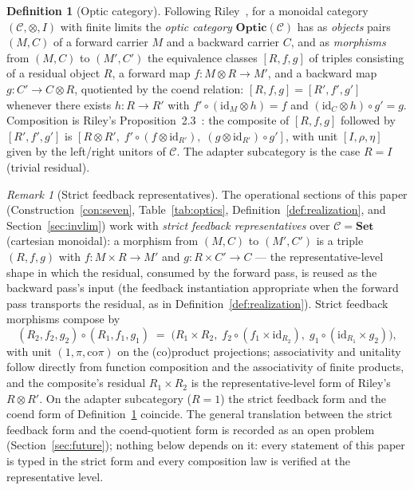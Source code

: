 \documentclass[11pt,a4paper]{article}
\theoremstyle{plain}
\theoremstyle{definition}
\newtheorem{definition}[theorem]{Definition}
\theoremstyle{remark}
\newtheorem{remark}[theorem]{Remark}
\newcommand{\CC}{\mathcal{C}}
\newcommand{\Optic}{\mathbf{Optic}}
\begin{document}
\begin{definition}[Optic category]
\label{def:optic}
Following Riley~\cite{riley2018optics}, for a monoidal category
$(\CC, \otimes, I)$ with finite limits the \emph{optic category}
$\Optic(\CC)$ has as \emph{objects} pairs $(M, C)$ of a forward
carrier $M$ and a backward carrier $C$, and as \emph{morphisms} from
$(M, C)$ to $(M', C')$ the equivalence classes $[R, f, g]$ of triples
consisting of a residual object $R$, a forward map
$f : M \otimes R \to M'$, and a backward map $g : C' \to C \otimes
R$, quotiented by the coend relation: $[R, f, g] = [R', f', g']$
whenever there exists $h : R \to R'$ with
$f' \circ (\mathrm{id}_M \otimes h) = f$ and
$(\mathrm{id}_C \otimes h) \circ g' = g$. Composition is
Riley's Proposition~2.3~\cite{riley2018optics}: the composite of
$[R, f, g]$ followed by $[R', f', g']$ is
$[R \otimes R',\; f' \circ (f \otimes \mathrm{id}_{R'}),\;
(g \otimes \mathrm{id}_{R'}) \circ g']$, with unit
$[I, \rho, \eta]$ given by the left/right unitors of $\CC$. The
adapter subcategory is the case $R = I$ (trivial residual).
\end{definition}

\begin{remark}[Strict feedback representatives]
\label{rem:optic-strict}
The operational sections of this paper
(Construction~\ref{con:seven}, Table~\ref{tab:optics},
Definition~\ref{def:realization}, and
Section~\ref{sec:invlim}) work with \emph{strict feedback
representatives} over $\CC = \mathbf{Set}$ (cartesian monoidal): a
morphism from $(M, C)$ to $(M', C')$ is a triple $(R, f, g)$ with
$f : M \times R \to M'$ and $g : R \times C' \to C$ --- the
representative-level shape in which the residual, consumed by the
forward pass, is reused as the backward pass's input (the feedback
instantiation appropriate when the forward pass transports the
residual, as in Definition~\ref{def:realization}). Strict feedback
morphisms compose by
\begin{equation}\label{eq:feedback-comp}
  (R_2, f_2, g_2) \circ (R_1, f_1, g_1)
  \;=\; \bigl(R_1 \times R_2,\;
  f_2 \circ (f_1 \times \mathrm{id}_{R_2}),\;
  g_1 \circ (\mathrm{id}_{R_1} \times g_2)\bigr),
\end{equation}
with unit $(1, \pi, \mathrm{co}\pi)$ on the (co)product projections;
associativity and unitality follow directly from function
composition and the associativity of finite products, and the
composite's residual $R_1 \times R_2$ is the representative-level
form of Riley's $R \otimes R'$. On the adapter subcategory
($R = 1$) the strict feedback form and the coend form of
Definition~\ref{def:optic} coincide. The general translation
between the strict feedback form and the coend-quotient form is
recorded as an open problem (Section~\ref{sec:future}); nothing
below depends on it: every statement of this paper is typed in the
strict form and every composition law is verified at the
representative level.
\end{remark}
\end{document}
